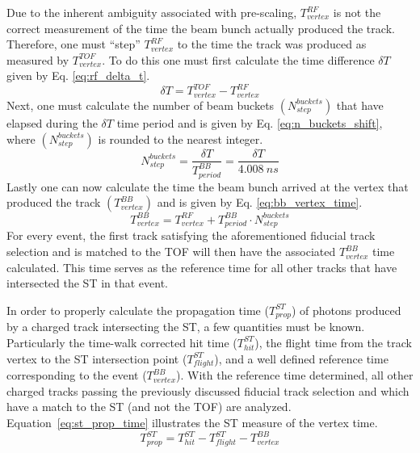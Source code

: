 Due to the inherent ambiguity associated with pre-scaling,  $T^{RF}_{vertex}$ is not the correct measurement of the time the beam bunch actually produced the track.  Therefore, one must ``step'' $T^{RF}_{vertex}$ to the time the track was produced as measured by $T^{TOF}_{vertex}$.  To do this one must first calculate the time difference $\delta T$ given by Eq. \ref{eq:rf_delta_t}.
	\begin{equation} \label{eq:rf_delta_t}
		\delta T = T^{TOF}_{vertex} - T^{RF}_{vertex}
	\end{equation}
Next, one must calculate the number of beam buckets $(N^{buckets}_{step})$ that have elapsed during the $\delta T$ time period and is given by Eq. \ref{eq:n_buckets_shift}, where $(N^{buckets}_{step})$ is rounded to the nearest integer.
	\begin{equation} \label{eq:n_buckets_shift}
		N^{buckets}_{step} = \frac{\delta T}{T^{BB}_{period}} = \frac{\delta T}{4.008\ ns}
	\end{equation}
Lastly one can now calculate the time the beam bunch arrived at the vertex that produced the track $(T^{BB}_{vertex})$ and is given by Eq. \ref{eq:bb_vertex_time}.
	\begin{equation} \label{eq:bb_vertex_time}
		T^{BB}_{vertex} = T^{RF}_{vertex} + T^{BB}_{period} \cdot N^{buckets}_{step}
	\end{equation}
For every event, the first track satisfying the aforementioned fiducial track selection and is matched to the TOF will then have the associated $T^{BB}_{vertex}$ time calculated.  This time serves as the reference time for all other tracks that have intersected the ST in that event.

In order to properly calculate the propagation time ($T^{ST}_{prop}$) of photons produced by a charged track intersecting the ST, a few quantities must be known.  Particularly the time-walk corrected hit time ($T^{ST}_{hit}$), the flight time from the track vertex to the ST intersection point ($T^{ST}_{flight}$), and a well defined reference time corresponding to the event ($T^{BB}_{vertex}$).  With the reference time determined, all other charged tracks passing the previously discussed fiducial track selection and which have a match to the ST (and not the TOF) are analyzed.  Equation~\ref{eq:st_prop_time} illustrates the ST measure of the vertex time.
	\begin{equation} \label{eq:st_prop_time}
		T^{ST}_{prop} = T^{ST}_{hit} - T^{ST}_{flight} - T^{BB}_{vertex}
	\end{equation} 

